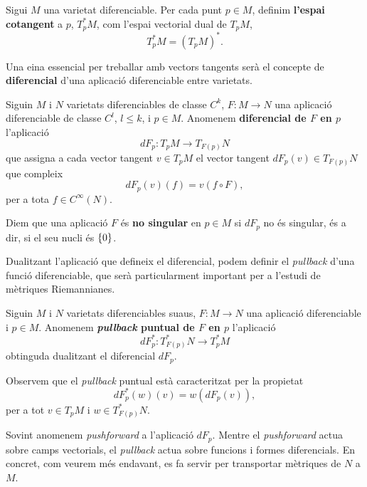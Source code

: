 \begin{defi}
    Sigui $M$ una varietat diferenciable. Per cada punt $p\in M$, definim \textbf{l'espai cotangent} a $p$, $T^*_pM$, com l'espai vectorial dual de $T_pM$,
    \begin{equation*}
        T^*_pM = (T_pM)^*.
    \end{equation*}
\end{defi}






Una eina essencial per treballar amb vectors tangents serà el concepte de \textbf{diferencial} d'una aplicació diferenciable entre varietats.
\begin{defi}
    Siguin $M$ i $N$ varietats diferenciables de classe $C^k$, $F:M\to N$ una aplicació diferenciable de classe $C^l$, $l\le k$, i $p\in M$. Anomenem \textbf{diferencial de $F$ en $p$} l'aplicació
    \begin{equation*}
        dF_p:T_pM\to T_{F(p)}N
    \end{equation*}
    que assigna a cada vector tangent $v\in T_pM$ el vector tangent $dF_p(v)\in T_{F(p)}N$ que compleix
    \begin{equation*}
        dF_p(v)(f) = v(f\circ F),
    \end{equation*}
    per a tota $f\in C^\infty(N)$.
\end{defi}
\begin{defi}
    Diem que una aplicació $F$ és \textbf{no singular} en $p\in M$ si $dF_p$ no és singular, és a dir, si el seu nucli és $\{0\}$.
\end{defi}
Dualitzant l'aplicació que defineix el diferencial, podem definir el \textit{pullback} d'una funció diferenciable, que serà particularment important per a l'estudi de mètriques Riemannianes.
\begin{defi}
    Siguin $M$ i $N$ varietats diferenciables suaus, $F:M\to N$ una aplicació diferenciable i $p\in M$. Anomenem \textbf{\textit{pullback} puntual de $F$ en $p$} l'aplicació
    \begin{equation*}
        dF_p^*:T_{F(p)}^*N\to T^*_pM 
    \end{equation*}
    obtinguda dualitzant el diferencial $dF_p$.
\end{defi}
Observem que el \textit{pullback} puntual està caracteritzat per la propietat
\begin{equation*}
    dF_p^*(w)(v) = w(dF_p(v)),
\end{equation*}
per a tot $v\in T_pM$ i $w\in T^*_{F(p)}N$.
\begin{obs}
    Sovint anomenem \textit{pushforward} a l'aplicació $dF_p$. Mentre el \textit{pushforward} actua sobre camps vectorials, el \textit{pullback} actua sobre funcions i formes diferencials. En concret, com veurem més endavant, es fa servir per transportar mètriques de $N$ a $M$.
\end{obs}

